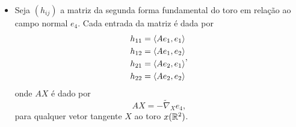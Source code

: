 \documentclass[10pt,a4paper]{beamer}
\theoremstyle{definition}
\begin{document}
\begin{frame}

	\begin{itemize}
		
		\item Seja $(h_{ij})$ a matriz da segunda forma fundamental do toro em relação ao campo normal $e_4$. Cada entrada da matriz é dada por
		\begin{equation*}
		\begin{split}
		h_{11} &= \left\langle A e_1,e_1 \right\rangle\\
		h_{12} &= \left\langle A e_1,e_2 \right\rangle\\
		h_{21} &= \left\langle A e_2,e_1 \right\rangle\\
		h_{22} &= \left\langle A e_2,e_2 \right\rangle
		\end{split},
		\end{equation*}
		onde $AX$ é dado por
		\[ AX = -\tilde{\nabla}_X e_4, \]
		para qualquer vetor tangente $X$ ao toro $x(\mathbb R^2)$.
		
	\end{itemize}

\end{frame}
\end{document}

